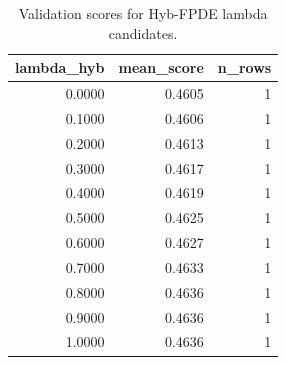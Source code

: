 \begin{table}[t]
\caption{Validation scores for Hyb-FPDE lambda candidates.}
\label{tab:lambda_distribution_computed}
\centering
\begin{tabular}{rrr}
\toprule
lambda\_hyb & mean\_score & n\_rows \\
\midrule
0.0000 & 0.4605 & 1 \\
0.1000 & 0.4606 & 1 \\
0.2000 & 0.4613 & 1 \\
0.3000 & 0.4617 & 1 \\
0.4000 & 0.4619 & 1 \\
0.5000 & 0.4625 & 1 \\
0.6000 & 0.4627 & 1 \\
0.7000 & 0.4633 & 1 \\
0.8000 & 0.4636 & 1 \\
0.9000 & 0.4636 & 1 \\
1.0000 & 0.4636 & 1 \\
\bottomrule
\end{tabular}

\end{table}
